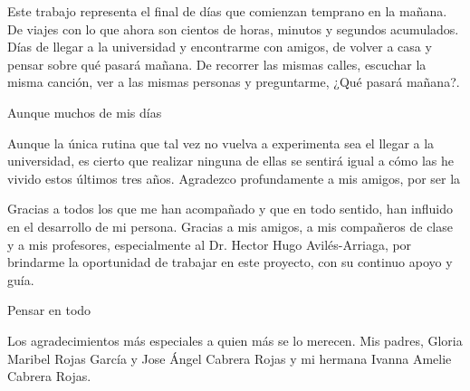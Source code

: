 
Este trabajo representa el final de días que comienzan temprano en la mañana. De viajes con lo que ahora son cientos de horas, minutos y segundos acumulados. Días de llegar a la universidad y encontrarme con amigos, de volver a casa y pensar sobre qué pasará mañana. De recorrer las mismas calles, escuchar la misma canción, ver a las mismas personas y preguntarme, ¿Qué pasará mañana?. 

Aunque muchos de mis días 

Aunque la única rutina que tal vez no vuelva a experimenta sea el llegar a la universidad, es cierto que realizar ninguna de ellas se sentirá igual a cómo las he vivido estos últimos tres años. Agradezco profundamente a mis amigos, por ser la 

Gracias a todos los que me han acompañado y que en todo sentido, han influido en el desarrollo de mi persona. Gracias a mis amigos, a mis compañeros de clase y a mis profesores, especialmente al Dr. Hector Hugo Avilés-Arriaga, por brindarme la oportunidad de trabajar en este proyecto, con su continuo apoyo y guía. 

Pensar en todo

Los agradecimientos más especiales a quien más se lo merecen. Mis padres, Gloria Maribel Rojas García y Jose Ángel Cabrera Rojas y mi hermana Ivanna Amelie Cabrera Rojas.  


